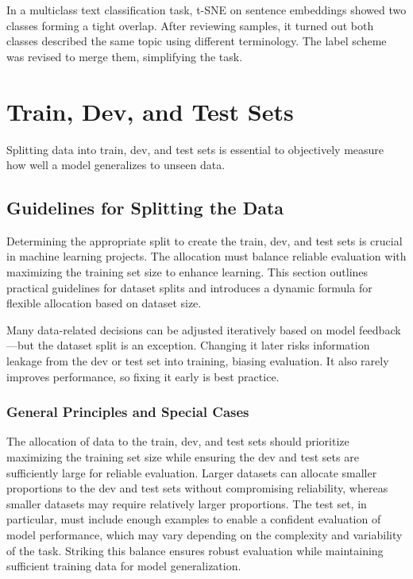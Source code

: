 \documentclass[12pt,openany]{book}
\begin{document}
\begin{examplebox}
In a multiclass text classification task, t-SNE on sentence embeddings showed two classes forming a tight overlap. After reviewing samples, it turned out both classes described the same topic using different terminology. The label scheme was revised to merge them, simplifying the task.
\end{examplebox}




\chapter{Train, Dev, and Test Sets}


Splitting data into train, dev, and test sets is essential to objectively measure how well a model generalizes to unseen data.


\section{Guidelines for Splitting the Data}

Determining the appropriate split to create the train, dev, and test sets is crucial in machine learning projects. The allocation must balance reliable evaluation with maximizing the training set size to enhance learning. This section outlines practical guidelines for dataset splits and introduces a dynamic formula for flexible allocation based on dataset size.

\begin{notebox}
Many data-related decisions can be adjusted iteratively based on model feedback—but the dataset split is an exception. Changing it later risks information leakage from the dev or test set into training, biasing evaluation. It also rarely improves performance, so fixing it early is best practice.
\end{notebox}


\subsection{General Principles and Special Cases}

The allocation of data to the train, dev, and test sets should prioritize maximizing the training set size while ensuring the dev and test sets are sufficiently large for reliable evaluation. Larger datasets can allocate smaller proportions to the dev and test sets without compromising reliability, whereas smaller datasets may require relatively larger proportions. The test set, in particular, must include enough examples to enable a confident evaluation of model performance, which may vary depending on the complexity and variability of the task. Striking this balance ensures robust evaluation while maintaining sufficient training data for model generalization.
\end{document}
